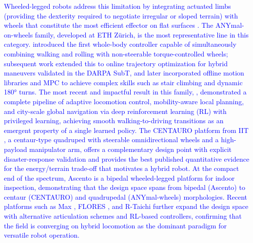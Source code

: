 \documentclass[preprint,12pt]{elsarticle}
\newcommand{\revblue}[1]{\textcolor{blue}{#1}}
\begin{document}
\revblue{Wheeled-legged robots address this limitation by integrating actuated limbs (providing the dexterity required to negotiate irregular or sloped terrain) with wheels that constitute the most efficient effector on flat surfaces \citep{Bjelonic2022Survey}. The ANYmal-on-wheels family, developed at ETH Z\"{u}rich, is the most representative line in this category. \citet{Bjelonic2019KeepRollin} introduced the first whole-body controller capable of simultaneously combining walking and rolling with non-steerable torque-controlled wheels; subsequent work \citep{bjelonic2019} extended this to online trajectory optimization for hybrid maneuvers validated in the DARPA SubT, and \citet{Bjelonic2022OfflineMotion} later incorporated offline motion libraries and MPC to achieve complex skills such as stair climbing and dynamic 180° turns. The most recent and impactful result in this family, \citet{Lee2024Science}, demonstrated a complete pipeline of adaptive locomotion control, mobility-aware local planning, and city-scale global navigation via deep reinforcement learning (RL) with privileged learning, achieving smooth walking-to-driving transitions as an emergent property of a single learned policy. The CENTAURO platform from IIT \citep{Kashiri2019CENTAURO,Klamt2019CENTAURO}, a centaur-type quadruped with steerable omnidirectional wheels and a high-payload manipulator arm, offers a complementary design point with explicit disaster-response validation and provides the best published quantitative evidence for the energy/terrain trade-off that motivates a hybrid robot. At the compact end of the spectrum, Ascento \citep{Klemm2019Ascento,Klemm2020AscentoRAL} is a bipedal wheeled-legged platform for indoor inspection, demonstrating that the design space spans from bipedal (Ascento) to centaur (CENTAURO) and quadrupedal (ANYmal-wheels) morphologies. Recent platforms such as Max \citep{Liu2024Max}, FLORES \citep{Cui2025FLORES}, and R-Taichi \citep{Jiang2025RTaichi} further expand the design space with alternative articulation schemes and RL-based controllers, confirming that the field is converging on hybrid locomotion as the dominant paradigm for versatile robot operation.}
\end{document}
